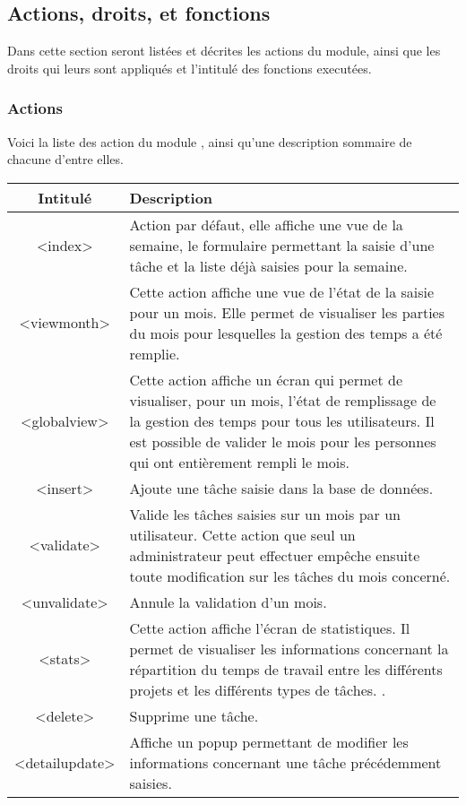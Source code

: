 \clearpage


\subsection{Actions, droits, et fonctions}
Dans cette section seront listées et décrites les actions du module, ainsi que les droits qui leurs sont appliqués et l'intitulé des fonctions executées. 

\subsubsection{Actions}

Voici la liste des action du module \timemanager, ainsi qu'une description sommaire de chacune d'entre elles.\\
\begin{tabular}{|c|p{9cm}|}
 \hline
 \textbf{Intitulé} & \textbf{Description} \\
 \hline
 \hline
 <index> & Action par défaut, elle affiche une vue de la semaine, le formulaire permettant la saisie d'une tâche et la liste déjà saisies pour la semaine. \\ 
 \hline
 <viewmonth> & Cette action affiche une vue de l'état de la saisie pour un mois. Elle permet de visualiser les parties du mois pour lesquelles la gestion des temps a été remplie.\\ 
 \hline
  <globalview> & Cette action affiche un écran qui permet de visualiser, pour un mois, l'état de remplissage de la gestion des temps pour tous les utilisateurs. Il est possible de valider le mois pour les personnes qui ont entièrement rempli le mois. \\ 
 \hline
  <insert> & Ajoute une tâche saisie dans la base de données. \\
 \hline
  <validate> & Valide les tâches saisies sur un mois par un utilisateur. Cette action que seul un administrateur peut effectuer empêche ensuite toute modification sur les tâches du mois concerné. \\
 \hline
  <unvalidate> & Annule la validation d'un mois. \\ 
 \hline
 <stats> & Cette action affiche l'écran de statistiques. Il permet de visualiser les informations concernant la répartition du temps de travail entre les différents projets et les différents types de tâches. . \\
 \hline
 <delete> & Supprime une tâche.  \\ 
 \hline
 <detailupdate> & Affiche un popup permettant de modifier les informations concernant une tâche précédemment saisies. \\ 
 \hline
\end{tabular}

